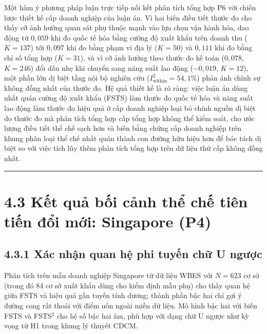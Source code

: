 \documentclass[
  a4paper,
  13pt]{extreport}
\begin{document}
Một hàm ý phương pháp luận trực tiếp nối kết phân tích tổng hợp P6 với
chiến lược thiết kế cấp doanh nghiệp của luận án. Vì hai biến điều tiết
thước đo cho thấy cỡ ảnh hưởng quan sát phụ thuộc mạnh vào lựa chọn vận
hành hóa, dao động từ \(0{,}059\) khi đo quốc tế hóa bằng cường độ xuất
khẩu trên doanh thu (\(K = 137\)) tới \(0{,}097\) khi đo bằng phạm vi
địa lý (\(K = 50\)) và \(0{,}111\) khi đo bằng chỉ số tổng hợp
(\(K = 31\)), và vì cỡ ảnh hưởng theo thước đo kế toán (\(0{,}078\),
\(K = 246\)) đổi dấu nhẹ khi chuyển sang năng suất lao động
(\(-0{,}019\), \(K = 12\)), một phần lớn dị biệt tầng nội bộ nghiên cứu
(\(I^2_{\text{within}} = 54{,}1\%\)) phản ánh chính sự không đồng nhất
của thước đo. Hệ quả thiết kế là rõ ràng: việc luận án dùng nhất quán
cường độ xuất khẩu (FSTS) làm thước đo quốc tế hóa và năng suất lao động
làm thước đo hiệu quả ở cấp doanh nghiệp loại bỏ chính nguồn dị biệt do
thước đo mà phân tích tổng hợp cấp tổng hợp không thể kiểm soát, cho ước
lượng điều tiết thể chế sạch hơn và biến bằng chứng cấp doanh nghiệp
trên khung phân loại thể chế nhất quán thành con đường hữu hiệu hơn để
bóc tách dị biệt so với việc tích lũy thêm phân tích tổng hợp trên dữ
liệu thứ cấp không đồng nhất.

\begin{center}\rule{0.5\linewidth}{0.5pt}\end{center}

\hypertarget{kux1ebft-quux1ea3-bux1ed1i-cux1ea3nh-thux1ec3-chux1ebf-tiuxean-tiux1ebfn-ux111ux1ed5i-mux1edbi-singapore-p4}{%
\section{4.3 Kết quả bối cảnh thể chế tiên tiến đổi mới: Singapore
(P4)}\label{kux1ebft-quux1ea3-bux1ed1i-cux1ea3nh-thux1ec3-chux1ebf-tiuxean-tiux1ebfn-ux111ux1ed5i-mux1edbi-singapore-p4}}

\hypertarget{xuxe1c-nhux1eadn-quan-hux1ec7-phi-tuyux1ebfn-chux1eef-u-ngux1b0ux1ee3c}{%
\subsection{4.3.1 Xác nhận quan hệ phi tuyến chữ U
ngược}\label{xuxe1c-nhux1eadn-quan-hux1ec7-phi-tuyux1ebfn-chux1eef-u-ngux1b0ux1ee3c}}

Phân tích trên mẫu doanh nghiệp Singapore từ dữ liệu WBES với
\(N = 623\) cơ sở (trong đó 84 cơ sở xuất khẩu dùng cho kiểm định mẫu
phụ) cho thấy quan hệ giữa FSTS và hiệu quả gần tuyến tính dương; thành
phần bậc hai chỉ gợi ý đường cong rất thoải với điểm uốn ngoài miền dữ
liệu. Mô hình bậc hai với biến FSTS và FSTS\(^2\) cho hệ số bậc hai âm,
phù hợp với dạng chữ U ngược như kỳ vọng từ H1 trong khung lý thuyết
CDCM.
\end{document}
